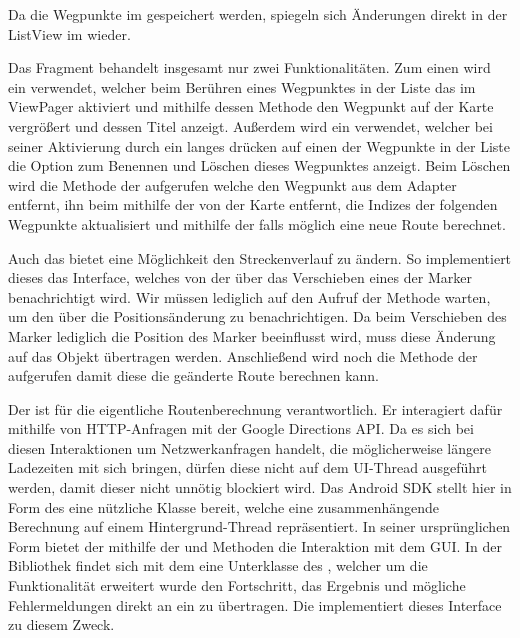Da die Wegpunkte im  gespeichert werden, spiegeln sich Änderungen direkt in der ListView im  wieder.
	
Das Fragment behandelt insgesamt nur zwei Funktionalitäten. Zum einen wird ein  verwendet, welcher beim Berühren eines Wegpunktes in der Liste das  im ViewPager aktiviert und mithilfe dessen  Methode den Wegpunkt auf der Karte vergrößert und dessen Titel anzeigt. Außerdem wird ein  verwendet, welcher bei seiner Aktivierung durch ein langes drücken auf einen der Wegpunkte in der Liste die Option zum Benennen und Löschen dieses Wegpunktes anzeigt.  Beim Löschen wird die  Methode der  aufgerufen welche den Wegpunkt aus dem Adapter entfernt, ihn beim  mithilfe der  von der Karte entfernt, die Indizes der folgenden Wegpunkte aktualisiert und mithilfe der  falls möglich eine neue Route berechnet.

Auch das  bietet eine Möglichkeit den Streckenverlauf zu ändern. So implementiert dieses das  Interface, welches von der  über das Verschieben eines der Marker benachrichtigt wird. Wir müssen lediglich auf den Aufruf der  Methode warten, um den  über die Positionsänderung zu benachrichtigen. Da beim Verschieben des Marker lediglich die Position des Marker beeinflusst wird, muss diese Änderung auf das  Objekt übertragen werden. Anschließend wird noch die  Methode der  aufgerufen damit diese die geänderte Route berechnen kann.

Der  ist für die eigentliche Routenberechnung verantwortlich. Er interagiert dafür mithilfe von HTTP-Anfragen mit der Google Directions API. Da es sich bei diesen Interaktionen um Netzwerkanfragen handelt, die möglicherweise längere Ladezeiten mit sich bringen, dürfen diese nicht auf dem UI-Thread ausgeführt werden, damit dieser nicht unnötig blockiert wird. Das Android SDK stellt hier in Form des  eine nützliche Klasse bereit, welche eine zusammenhängende Berechnung auf einem Hintergrund-Thread repräsentiert. In seiner ursprünglichen Form bietet der  mithilfe der  und  Methoden die Interaktion mit dem GUI. In der  Bibliothek findet sich mit dem  eine Unterklasse des , welcher um die Funktionalität erweitert wurde den Fortschritt, das Ergebnis und mögliche Fehlermeldungen direkt an ein  zu übertragen. Die  implementiert dieses Interface zu diesem Zweck. 

